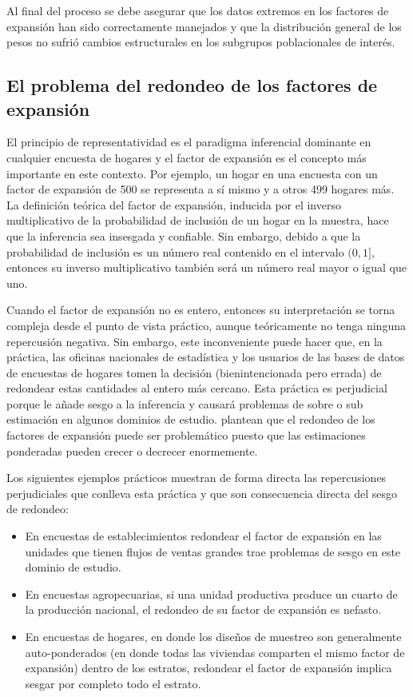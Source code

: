 \documentclass[
  12pt,
  spanish,
]{book}
\begin{document}
Al final del proceso se debe asegurar que los datos extremos en los factores de expansión han sido correctamente manejados y que la distribución general de los pesos no sufrió cambios estructurales en los subgrupos poblacionales de interés.

\hypertarget{el-problema-del-redondeo-de-los-factores-de-expansiuxf3n}{%
\subsection{El problema del redondeo de los factores de expansión}\label{el-problema-del-redondeo-de-los-factores-de-expansiuxf3n}}

El principio de representatividad es el paradigma inferencial dominante en cualquier encuesta de hogares y el factor de expansión es el concepto más importante en este contexto. Por ejemplo, un hogar en una encuesta con un factor de expansión de 500 se representa a sí mismo y a otros 499 hogares más. La definición teórica del factor de expansión, inducida por el inverso multiplicativo de la probabilidad de inclusión de un hogar en la muestra, hace que la inferencia sea insesgada y confiable. Sin embargo, debido a que la probabilidad de inclusión es un número real contenido en el intervalo \((0, 1]\), entonces su inverso multiplicativo también será un número real mayor o igual que uno.

Cuando el factor de expansión no es entero, entonces su interpretación se torna compleja desde el punto de vista práctico, aunque teóricamente no tenga ninguna repercusión negativa. Sin embargo, este inconveniente puede hacer que, en la práctica, las oficinas nacionales de estadística y los usuarios de las bases de datos de encuestas de hogares tomen la decisión (bienintencionada pero errada) de redondear estas cantidades al entero más cercano. Esta práctica es perjudicial porque le añade sesgo a la inferencia y causará problemas de sobre o sub estimación en algunos dominios de estudio. \citet{Sartore_Toppin_Young_Spiegelman_2019} plantean que el redondeo de los factores de expansión puede ser problemático puesto que las estimaciones ponderadas pueden crecer o decrecer enormemente.

Los siguientes ejemplos prácticos muestran de forma directa las repercusiones perjudiciales que conlleva esta práctica y que son consecuencia directa del sesgo de redondeo:

\begin{itemize}
\item
  En encuestas de establecimientos redondear el factor de expansión en las unidades que tienen flujos de ventas grandes trae problemas de sesgo en este dominio de estudio.
\item
  En encuestas agropecuarias, si una unidad productiva produce un cuarto de la producción nacional, el redondeo de su factor de expansión es nefasto.
\item
  En encuestas de hogares, en donde los diseños de muestreo son generalmente auto-ponderados (en donde todas las viviendas comparten el mismo factor de expansión) dentro de los estratos, redondear el factor de expansión implica sesgar por completo todo el estrato.
\end{itemize}
\end{document}
